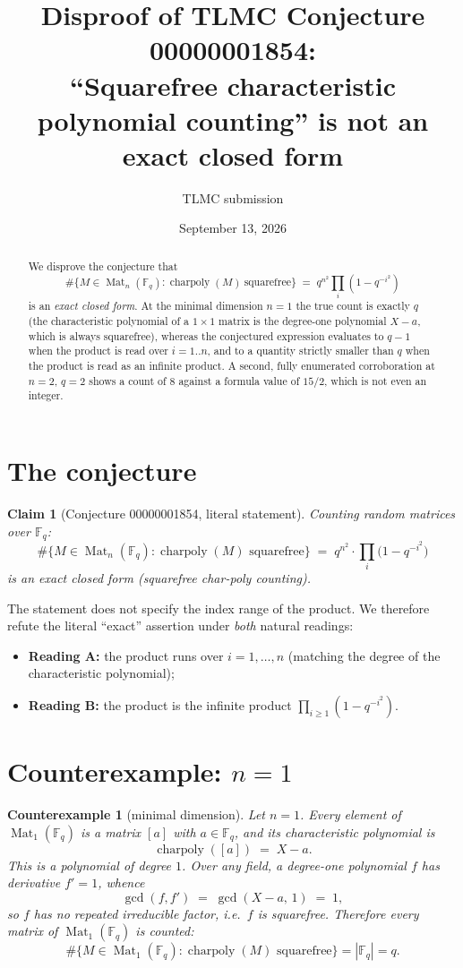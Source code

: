 \documentclass[11pt]{article}
\title{Disproof of TLMC Conjecture 00000001854:\\
``Squarefree characteristic polynomial counting'' is not an exact closed form}
\author{TLMC submission}
\date{September 13, 2026}
\newtheorem{claim}{Claim}
\newtheorem{counterexample}{Counterexample}
\newcommand{\Fq}{\mathbb{F}_q}
\newcommand{\Mat}{\operatorname{Mat}}
\begin{document}
\maketitle

\begin{abstract}
We disprove the conjecture that
\[
\#\{M \in \Mat_n(\Fq) : \operatorname{charpoly}(M)\ \text{squarefree}\}
\;=\;
q^{n^2}\!\prod_i (1 - q^{-i^2})
\]
is an \emph{exact closed form}. At the minimal dimension $n = 1$ the true count
is exactly $q$ (the characteristic polynomial of a $1 \times 1$ matrix is the
degree-one polynomial $X - a$, which is always squarefree), whereas the
conjectured expression evaluates to $q - 1$ when the product is read over
$i = 1..n$, and to a quantity strictly smaller than $q$ when the product is read
as an infinite product. A second, fully enumerated corroboration at $n = 2$,
$q = 2$ shows a count of $8$ against a formula value of $15/2$, which is not
even an integer.
\end{abstract}

\section{The conjecture}

\begin{claim}[Conjecture 00000001854, literal statement]
\label{conj}
Counting random matrices over $\Fq$:
\[
\#\{M \in \Mat_n(\Fq) : \operatorname{charpoly}(M) \text{ squarefree}\}
\;=\;
q^{n^2}\cdot\prod_i\bigl(1 - q^{-i^2}\bigr)
\]
is an \emph{exact closed form} (squarefree char-poly counting).
\end{claim}

The statement does not specify the index range of the product. We therefore
refute the literal ``exact'' assertion under \emph{both} natural readings:
\begin{itemize}
  \item \textbf{Reading A:} the product runs over $i = 1, \dots, n$ (matching
  the degree of the characteristic polynomial);
  \item \textbf{Reading B:} the product is the infinite product
  $\prod_{i \ge 1}(1 - q^{-i^2})$.
\end{itemize}

\section{Counterexample: \texorpdfstring{$n = 1$}{n = 1}}

\begin{counterexample}[minimal dimension]
\label{ce:n1}
Let $n = 1$. Every element of $\Mat_1(\Fq)$ is a matrix $[a]$ with $a \in \Fq$,
and its characteristic polynomial is
\[
\operatorname{charpoly}([a]) \;=\; X - a .
\]
This is a polynomial of degree $1$. Over any field, a degree-one polynomial $f$
has derivative $f' = 1$, whence
\[
\gcd(f, f') \;=\; \gcd(X - a,\, 1) \;=\; 1,
\]
so $f$ has no repeated irreducible factor, i.e.\ $f$ is squarefree.
Therefore \emph{every} matrix of $\Mat_1(\Fq)$ is counted:
\[
\#\{M \in \Mat_1(\Fq) : \operatorname{charpoly}(M) \text{ squarefree}\} = |\Fq| = q .
\]
\end{counterexample}
\end{document}
